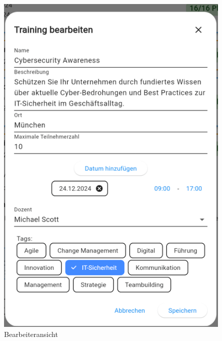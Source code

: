 \begin{figure}[htbp!]
    \centering
    \includegraphics[scale=0.7]{img/BearbeitungAnbierteransicht.png}
    \caption{Bearbeiteransicht}
    \label{AnbieterBE}
\end{figure}

